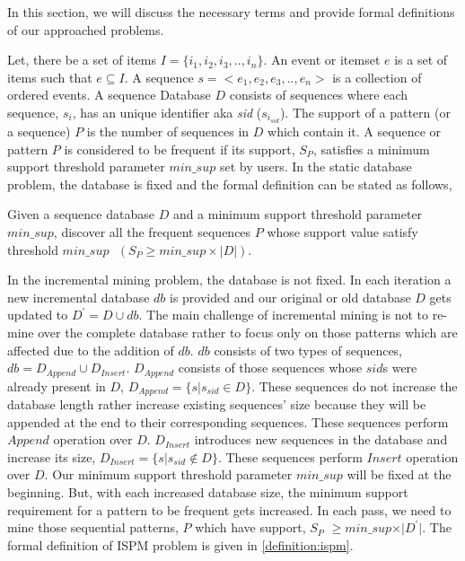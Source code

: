 In this section, we will discuss the necessary terms and provide formal definitions of our approached problems.

Let, there be a set of items $I=\{i_{1},i_{2},i_{3},..,i_{n}\}$. An event or itemset $e$ is a set of items such that $e \subseteq I$. A sequence $s=< e_{1},e_{2},e_{3},..,e_{n}>$ is a collection of ordered events. A sequence Database $D$ consists of sequences where each sequence, $s_{i}$, has an unique identifier aka \textit{sid} ($s_{i_{sid}}$). The support of a pattern (or a sequence) $P$ is the number of sequences in $D$ which contain it. A sequence or pattern $P$ is considered to be frequent if its support, $S_{P}$, satisfies a minimum support threshold parameter $min\_sup$ set by users. In the static database problem, the database is fixed and the formal definition can be stated as follows,

\begin{definition}
    Given a sequence database $D$ and a minimum support threshold parameter $min\_sup$, discover all the frequent sequences $P$ whose support value satisfy  threshold $min\_sup\text{ }(S_{P} \geq min\_sup \times |D|)$.
\end{definition}

In the incremental mining problem, the database is not fixed. In each iteration a new incremental database $db$ is provided and our original or old database $D$ gets updated to $D^{\prime}=D \cup db$. The main challenge of incremental mining is not to re-mine over the complete database rather to focus only on those patterns which are affected due to the addition of $db$. $db$ consists of two types of sequences, $db = D_{Append} \cup D_{Insert}$. $D_{Append}$ consists of those sequences whose $sid$s were already present in $D$, $D_{Append}=\{s \vert s_{sid} \in D\}$. These sequences do not increase the database length rather increase existing sequences' size because they will be appended at the end to their corresponding sequences. These sequences perform $Append$ operation over $D$. $D_{Insert}$ introduces new sequences in the database and increase its size, $D_{Insert}=\{s\vert s_{sid} \notin D \}$. These sequences perform $Insert$ operation over $D$. Our minimum support threshold parameter $min\_sup$ will be fixed at the beginning. But, with each increased database size, the minimum support requirement for a pattern to be frequent gets increased. In each pass, we need to mine those sequential patterns, $P$ which have support, $S_{P}$ $\geq min\_sup \times \vert D^{\prime} \vert$. The formal definition of ISPM problem is given in \ref{definition:ispm}.

